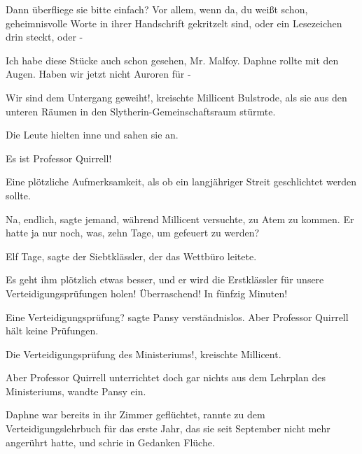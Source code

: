 \glqq{}Dann überfliege sie bitte einfach? Vor allem, wenn da, du weißt schon,
geheimnisvolle Worte in ihrer Handschrift gekritzelt sind, oder ein Lesezeichen
drin steckt, oder -\grqq{}

\glqq{}Ich habe diese Stücke auch schon gesehen, Mr. Malfoy.\grqq{} Daphne rollte
mit den Augen. \glqq{}Haben wir jetzt nicht Auroren für -\grqq{}

\glqq{}Wir sind dem Untergang geweiht!\grqq{}, kreischte Millicent Bulstrode, als
sie aus den unteren Räumen in den Slytherin-Gemeinschaftsraum stürmte.

Die Leute hielten inne und sahen sie an.

\glqq{}Es ist Professor Quirrell!\grqq{}

Eine plötzliche Aufmerksamkeit, als ob ein langjähriger Streit geschlichtet
werden sollte.

\glqq{}Na, endlich\grqq{}, sagte jemand, während Millicent versuchte, zu Atem zu
kommen. \glqq{}Er hatte ja nur noch, was, zehn Tage, um gefeuert zu werden?\grqq{}

\glqq{}Elf Tage\grqq{}, sagte der Siebtklässler, der das Wettbüro leitete.

\glqq{}Es geht ihm plötzlich etwas besser, und er wird die Erstklässler für
unsere Verteidigungsprüfungen holen! Überraschend! In fünfzig Minuten!\grqq{}

\glqq{}Eine Verteidigungsprüfung?\grqq{} sagte Pansy verständnislos. \glqq{}Aber
Professor Quirrell hält keine Prüfungen.\grqq{}

\glqq{}Die Verteidigungsprüfung des Ministeriums!\grqq{}, kreischte Millicent.

\glqq{}Aber Professor Quirrell unterrichtet doch gar nichts aus dem Lehrplan des
Ministeriums\grqq{}, wandte Pansy ein.

Daphne war bereits in ihr Zimmer geflüchtet, rannte zu dem Verteidigungslehrbuch
für das erste Jahr, das sie seit September nicht mehr angerührt hatte, und
schrie in Gedanken Flüche.

